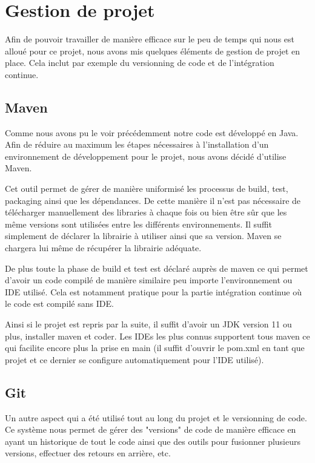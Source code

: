 \documentclass[final, noposter]{polytech/polytech}
\begin{document}
\chapter{Gestion de projet}
	Afin de pouvoir travailler de manière efficace sur le peu de temps qui nous est alloué pour ce projet, nous avons mis quelques éléments de gestion de projet en place.
	Cela inclut par exemple du versionning de code et de l'intégration continue.
	
	\section{Maven\label{sec:maven}}
		Comme nous avons pu le voir précédemment notre code est développé en Java.
		Afin de réduire au maximum les étapes nécessaires à l'installation d'un environnement de développement pour le projet, nous avons décidé d'utilise Maven.
		
		Cet outil permet de gérer de manière uniformisé les processus de build, test, packaging ainsi que les dépendances.
		De cette manière il n'est pas nécessaire de télécharger manuellement des libraries à chaque fois ou bien être sûr que les même versions sont utilisées entre les différents environnements.
		Il suffit simplement de déclarer la librairie à utiliser ainsi que sa version.
		Maven se chargera lui même de récupérer la librairie adéquate.
		
		De plus toute la phase de build et test est déclaré auprès de maven ce qui permet d'avoir un code compilé de manière similaire peu importe l'environnement ou IDE utilisé.
		Cela est notamment pratique pour la partie intégration continue où le code est compilé sans IDE.
		
		Ainsi si le projet est repris par la suite, il suffit d'avoir un JDK version 11 ou plus, installer maven et coder.
		Les IDEs les plus connus supportent tous maven ce qui facilite encore plus la prise en main (il suffit d'ouvrir le pom.xml en tant que projet et ce dernier se configure automatiquement pour l'IDE utilisé).
	
		
	\section{Git}
		Un autre aspect qui a été utilisé tout au long du projet et le versionning de code.
		Ce système nous permet de gérer des "versions" de code de manière efficace en ayant un historique de tout le code ainsi que des outils pour fusionner plusieurs versions, effectuer des retours en arrière, etc.
		
\end{document}
